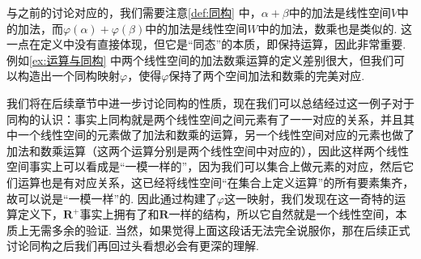 与之前的讨论对应的，我们需要注意\autoref{def:同构} 中，$\alpha+\beta$中的加法是线性空间$V$中的加法，而$\varphi(\alpha)+\varphi(\beta)$中的加法是线性空间$W$中的加法，数乘也是类似的. 这一点在定义中没有直接体现，但它是``同态''的本质，即保持运算，因此非常重要. 例如\autoref{ex:运算与同构} 中两个线性空间的加法数乘运算的定义差别很大，但我们可以构造出一个同构映射$\varphi$，使得$\varphi$保持了两个空间加法和数乘的完美对应.

我们将在后续章节中进一步讨论同构的性质，现在我们可以总结经过这一例子对于同构的认识：事实上同构就是两个线性空间之间元素有了一一对应的关系，并且其中一个线性空间的元素做了加法和数乘的运算，另一个线性空间对应的元素也做了加法和数乘运算（这两个运算分别是两个线性空间中对应的），因此这样两个线性空间事实上可以看成是``一模一样的''，因为我们可以集合上做元素的对应，然后它们运算也是有对应关系，这已经将线性空间``在集合上定义运算''的所有要素集齐，故可以说是``一模一样''的. 因此通过构建了$\varphi$这一映射，我们发现在这一奇特的运算定义下，$\mathbf{R}^+$事实上拥有了和$\mathbf{R}$一样的结构，所以它自然就是一个线性空间，本质上无需多余的验证. 当然，如果觉得上面这段话无法完全说服你，那在后续正式讨论同构之后我们再回过头看想必会有更深的理解.


